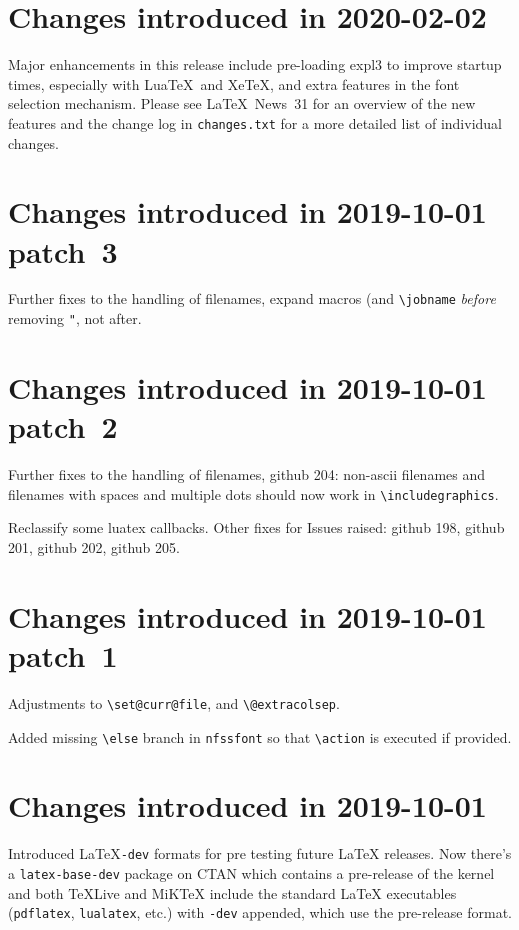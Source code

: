 \documentclass{ltxguide}
\newcommand\Lpack[1]{\mbox{\textsf{#1}}}
\newcommand\ghissue[1]{github #1}
\newcommand\ltnewsissue[1]{\LaTeX\ News~#1}
\newcommand\ghissue[1]{%
    \href{https://github.com/latex3/latex2e/issues/#1}{github #1}}
\newcommand\ltnewsissue[1]{%
    \href{https://www.latex-project.org/news/latex2e-news/ltnews#1.pdf}{\LaTeX\ News~#1}}
\begin{document}
\section{Changes introduced in 2020-02-02}

Major enhancements in this release include pre-loading \Lpack{expl3}
to improve startup times, especially with Lua\TeX\ and Xe\TeX, and
extra features in the font selection mechanism. Please see
\ltnewsissue{31}  for an overview of the new features and the change
log in \texttt{changes.txt} for a more detailed list of individual
changes.


\section{Changes introduced in 2019-10-01 patch~3}

Further fixes to the handling of filenames, expand macros (and
\verb|\jobname| \emph{before} removing \verb|"|, not after.

\section{Changes introduced in 2019-10-01 patch~2}

Further fixes to the handling of filenames, \ghissue{204}: non-ascii
filenames and filenames with spaces and multiple dots should now work
in \verb|\includegraphics|.

Reclassify some luatex callbacks.  Other fixes for Issues raised:
\ghissue{198}, \ghissue{201}, \ghissue{202}, \ghissue{205}.

\section{Changes introduced in 2019-10-01 patch~1}

Adjustments to \verb|\set@curr@file|, and \verb|\@extracolsep|.

Added missing \verb=\else= branch in \texttt{nfssfont} so that
\verb=\action= is executed if provided.

\section{Changes introduced in 2019-10-01}

Introduced \LaTeX\texttt{-dev} formats for pre testing future \LaTeX{}
releases. Now there's a \texttt{latex-base-dev} package on CTAN which
contains a pre-release of the \LaTeXe{} kernel and both \TeX Live and
MiK\TeX{} include the standard \LaTeX{} executables (\texttt{pdflatex},
\texttt{lualatex}, etc.) with \texttt{-dev} appended, which use the
pre-release format.
\end{document}
